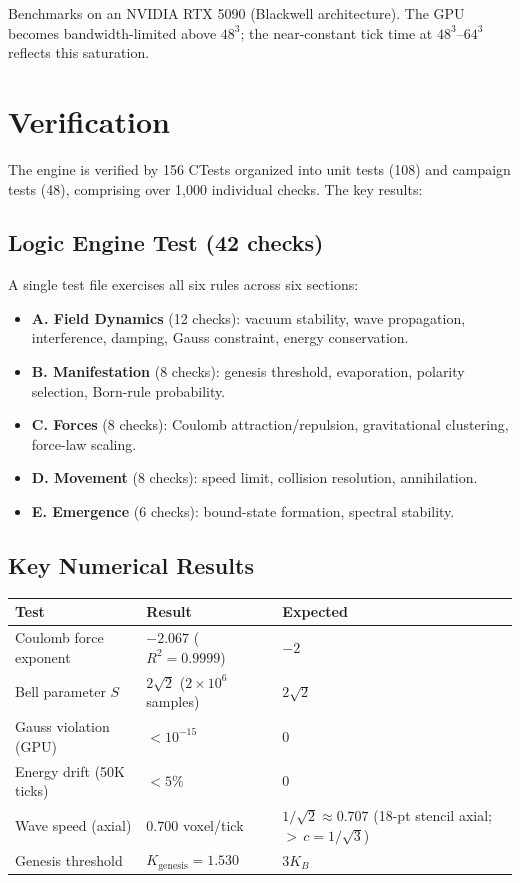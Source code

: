 \documentclass[11pt,a4paper]{article}
\newcommand{\KB}{K_B}
\theoremstyle{compact}
\begin{document}
Benchmarks on an NVIDIA RTX 5090 (Blackwell architecture). The GPU becomes bandwidth-limited above $48^3$; the near-constant tick time at $48^3$--$64^3$ reflects this saturation.


\section{Verification}
\label{sec:verification}

The engine is verified by 156 CTests organized into unit tests (108) and campaign tests (48), comprising over 1,000 individual checks. The key results:

\subsection*{Logic Engine Test (42 checks)}

A single test file exercises all six rules across six sections:
\begin{itemize}[nosep]
\item \textbf{A. Field Dynamics} (12 checks): vacuum stability, wave propagation, interference, damping, Gauss constraint, energy conservation.
\item \textbf{B. Manifestation} (8 checks): genesis threshold, evaporation, polarity selection, Born-rule probability.
\item \textbf{C. Forces} (8 checks): Coulomb attraction/repulsion, gravitational clustering, force-law scaling.
\item \textbf{D. Movement} (8 checks): speed limit, collision resolution, annihilation.
\item \textbf{E. Emergence} (6 checks): bound-state formation, spectral stability.
\end{itemize}

\subsection*{Key Numerical Results}

\begin{center}
\small
\begin{tabular}{lll}
\toprule
\textbf{Test} & \textbf{Result} & \textbf{Expected} \\
\midrule
Coulomb force exponent & $-2.067$ ($R^2 = 0.9999$) & $-2$ \\
Bell parameter $S$ & $2\sqrt{2}$ ($2 \times 10^6$ samples) & $2\sqrt{2}$ \\
Gauss violation (GPU) & $< 10^{-15}$ & $0$ \\
Energy drift (50K ticks) & $< 5\%$ & $0$ \\
Wave speed (axial) & $0.700$ voxel/tick & $1/\sqrt{2} \approx 0.707$ (18-pt stencil axial; ${>}\, c = 1/\sqrt{3}$) \\
Genesis threshold & $K_{\mathrm{genesis}} = 1.530$ & $3\KB$ \\
\bottomrule
\end{tabular}
\end{center}
\end{document}
